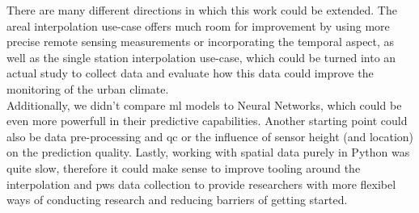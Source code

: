 There are many different directions in which this work could be extended. The areal interpolation use-case offers much room for improvement by using more precise remote sensing measurements or incorporating the temporal aspect, as well as the single station interpolation use-case, which could be turned into an actual study to collect data and evaluate how this data could improve the monitoring of the urban climate.\\
Additionally, we didn't compare \gls{ml} models to Neural Networks, which could be even more powerfull in their predictive capabilities. Another starting point could also be data pre-processing and \gls{qc} or the influence of sensor height (and location) on the prediction quality. Lastly, working with spatial data purely in Python was quite slow, therefore it could make sense to improve tooling around the interpolation and \gls{pws} data collection to provide researchers with more flexibel ways of conducting research and reducing barriers of getting started.